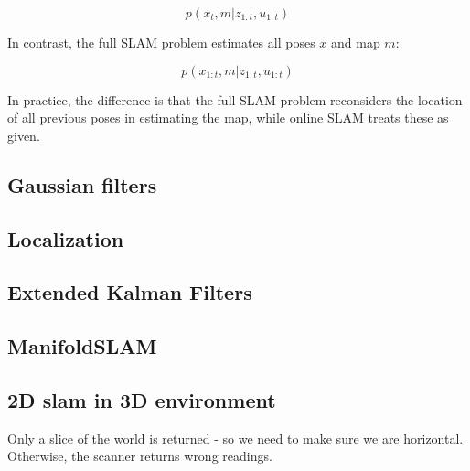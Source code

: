 \begin{equation}
p(x_{t}, m | z_{1:t}, u_{1:t})
\end{equation}

In contrast, the full SLAM problem estimates all poses $x$ and map $m$:

\begin{equation}
p(x_{1:t}, m | z_{1:t}, u_{1:t})
\end{equation}

In practice, the difference is that the full SLAM problem reconsiders the location of all previous poses in estimating the map, while online SLAM treats these as given. 



\subsection{Gaussian filters}


\subsection{Localization}


\subsection{Extended Kalman Filters}

\subsection{ManifoldSLAM}


\subsection{2D slam in 3D environment}
Only a slice of the world is returned - so we need to make sure we are horizontal. Otherwise, the scanner returns wrong readings.





